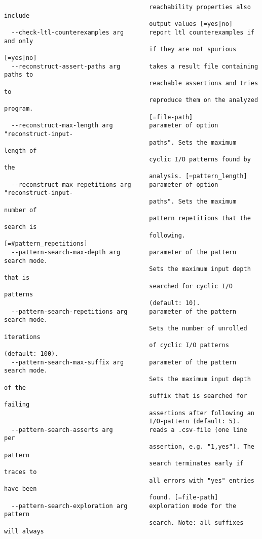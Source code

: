 \documentclass[natbib]{article}
\begin{document}
\begin{verbatim}
                                        reachability properties also include 
                                        output values [=yes|no]
  --check-ltl-counterexamples arg       report ltl counterexamples if and only 
                                        if they are not spurious [=yes|no]
  --reconstruct-assert-paths arg        takes a result file containing paths to
                                        reachable assertions and tries to 
                                        reproduce them on the analyzed program.
                                        [=file-path]
  --reconstruct-max-length arg          parameter of option "reconstruct-input-
                                        paths". Sets the maximum length of 
                                        cyclic I/O patterns found by the 
                                        analysis. [=pattern_length]
  --reconstruct-max-repetitions arg     parameter of option "reconstruct-input-
                                        paths". Sets the maximum number of 
                                        pattern repetitions that the search is 
                                        following. [=#pattern_repetitions]
  --pattern-search-max-depth arg        parameter of the pattern search mode. 
                                        Sets the maximum input depth that is 
                                        searched for cyclic I/O patterns 
                                        (default: 10).
  --pattern-search-repetitions arg      parameter of the pattern search mode. 
                                        Sets the number of unrolled iterations 
                                        of cyclic I/O patterns (default: 100).
  --pattern-search-max-suffix arg       parameter of the pattern search mode. 
                                        Sets the maximum input depth of the 
                                        suffix that is searched for failing 
                                        assertions after following an 
                                        I/O-pattern (default: 5).
  --pattern-search-asserts arg          reads a .csv-file (one line per 
                                        assertion, e.g. "1,yes"). The pattern 
                                        search terminates early if traces to 
                                        all errors with "yes" entries have been
                                        found. [=file-path]
  --pattern-search-exploration arg      exploration mode for the pattern 
                                        search. Note: all suffixes will always 

\end{verbatim}
\end{document}
